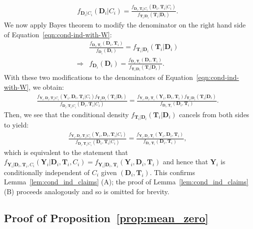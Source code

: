 \documentclass[12pt]{article}
\def\bse{\begin{eqnarray*}}
\def\ese{\end{eqnarray*}}
\def\bse{\begin{eqnarray*}}
\def\ese{\end{eqnarray*}}
\def\bS{{\mathbf S}}
\def\bzero{{\mathbf 0}}
\def\btheta{{\boldsymbol{\theta}}}
\def\bzero{{\boldsymbol{0}}}
\def\bD{{\boldsymbol D}}
\def\bS{{\boldsymbol S}}
\def\bT{{\boldsymbol T}}
\def\bY{{\boldsymbol Y}}
\def\tilD{\bD}
\def\E{\rm E}
\newtheorem{proposition}{Proposition}
\begin{document}
\bse
f_{ \tilD_i|C_i}(\tilD_i|C_i)=\frac{f_{\tilD_i,\bT_i|C_i}(\tilD_i,\bT_i|C_i)}{f_{\bT_i|\tilD_i}(\bT_i|\tilD_i)}.
\ese
We now apply Bayes theorem to modify the denominator on the right hand side of Equation~\eqref{eqn:cond-ind-with-W}:
\bse
&\frac{f_{\tilD_i,\bT_i}(\tilD_i,\bT_i)}{f_{ \tilD_i}(\tilD_i)}=f_{\bT_i|\tilD_i}(\bT_i|\tilD_i)\nonumber\\
\Rightarrow&f_{ \tilD_i}(\tilD_i)=\frac{f_{\tilD_i,\bT_i}(\tilD_i,\bT_i)}{f_{\bT_i|\tilD_i}(\bT_i|\tilD_i)}.
\ese
With these two modifications to the denominators of Equation~\eqref{eqn:cond-ind-with-W}, we obtain:
\bse
\frac{f_{\bY_i, \tilD_i, \bT_i| C_i}(\bY_i,\tilD_i, \bT_i|C_i)f_{\bT_i|\tilD_i}(\bT_i|\tilD_i)}{f_{\tilD_i,\bT_i|C_i}(\tilD_i,\bT_i|C_i)} = \frac{f_{\bY_i, \tilD_i, \bT_i}(\bY_i,\tilD_i,\bT_i)f_{\bT_i|\tilD_i}(\bT_i|\tilD_i)}{f_{\tilD_i,\bT_i}(\tilD_i,\bT_i)}.
\ese
Then, we see that the conditional density $f_{\bT_i|\tilD_i}(\bT_i|\tilD_i)$ cancels from both sides to yield:
\bse
\frac{f_{\bY_i, \tilD_i, \bT_i| C_i}(\bY_i,\tilD_i, \bT_i|C_i)}{f_{\tilD_i,\bT_i|C_i}(\tilD_i,\bT_i|C_i)} = \frac{f_{\bY_i, \tilD_i, \bT_i}(\bY_i,\tilD_i,\bT_i)}{f_{\tilD_i,\bT_i}(\tilD_i,\bT_i)},
\ese
which is equivalent to the statement that $f_{\bY_i|\tilD_i,\bT_i,C_i}(\bY_i|\tilD_i,\bT_i,C_i)=f_{\bY_i|\tilD_i,\bT_i}(\bY_i,\tilD_i,\bT_i)$ and hence that $\bY_i$ is conditionally independent of $C_i$ given $(\tilD_i, \bT_i)$. This confirms Lemma~\ref{lem:cond_ind_claims} (A); the proof of Lemma~\ref{lem:cond_ind_claims} (B) proceeds analogously and so is omitted for brevity.

\subsection{Proof of Proposition~\ref{prop:mean_zero}}
\label{sec:mean_zero_proof}
\end{document}
